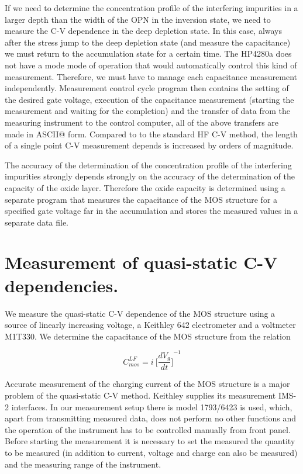 If we need to determine the concentration profile of the interfering
impurities in a larger depth than the width of the OPN in the
inversion state, we need to measure the C-V dependence in the deep
depletion state. In this case, always after the stress jump to the
deep depletion state (and measure the capacitance) we must return to
the accumulation state for a certain time. The HP4280a does not have a
mode mode of operation that would automatically control this kind of
measurement. Therefore, we must have to manage each capacitance
measurement independently. Measurement control cycle program then
contains the setting of the desired gate voltage, execution of the
capacitance measurement (starting the measurement and waiting for the
completion) and the transfer of data from the measuring instrument to
the control computer, all of the above transfers are made in ASCII@
form. Compared to to the standard HF C-V method, the length of a
single point C-V measurement depends is increased by orders of
magnitude.

The accuracy of the determination of the concentration profile of the
interfering impurities strongly depends strongly on the accuracy of
the determination of the capacity of the oxide layer.  Therefore the
oxide capacity is determined using a separate program that measures
the capacitance of the MOS structure for a specified gate voltage far
in the accumulation and stores the measured values in a separate data
file.

\section{Measurement of quasi-static C-V dependencies.}\label{sec:5.2}

We measure the quasi-static C-V dependence of the MOS structure using
a source of linearly increasing voltage, a Keithley 642 electrometer
and a voltmeter M1T330. We determine the capacitance of the MOS
structure from the relation

\begin{equation}\label{eq:5.1}
  C_{mos}^{LF} = i\ {\bigg[\frac{dV_{g}}{dt}\bigg]}^{-1}
\end{equation}

Accurate measurement of the charging current of the MOS structure is a
major problem of the quasi-static C-V method. Keithley supplies its
measurement IMS-2 interfaces. In our measurement setup there is model
1793/6423 is used, which, apart from transmitting measured data, does
not perform no other functions and the operation of the instrument has
to be controlled manually from front panel.  Before starting the
measurement it is necessary to set the measured the quantity to be
measured (in addition to current, voltage and charge can also be
measured) and the measuring range of the instrument.

